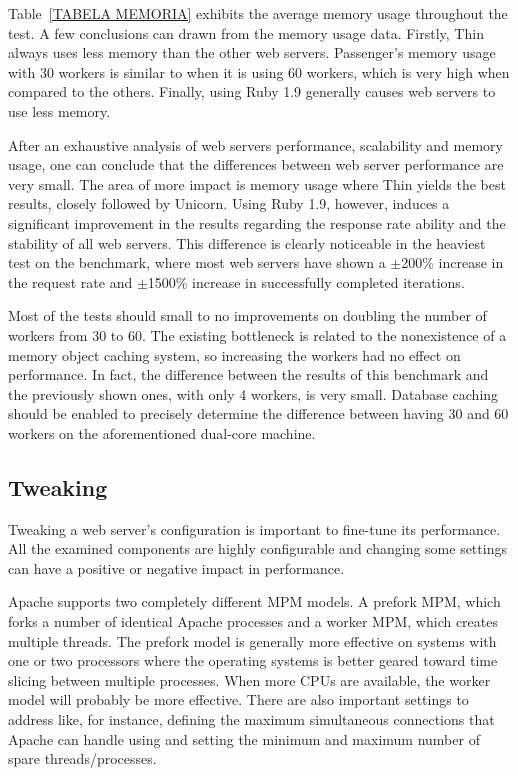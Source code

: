 Table~\ref{TABELA MEMORIA} exhibits the average memory usage throughout the test. A few conclusions can drawn from the memory usage data. Firstly, Thin always uses less memory than the other web servers. Passenger's memory usage with 30 workers is similar to when it is using 60 workers, which is very high when compared to the others. Finally, using Ruby 1.9 generally causes web servers to use less memory.

After an exhaustive analysis of web servers performance, scalability and memory usage, one can conclude that the differences between web server performance are very small. The area of more impact is memory usage where Thin yields the best results, closely followed by Unicorn. Using Ruby 1.9, however, induces a significant improvement in the results regarding the response rate ability and the stability of all web servers. This difference is clearly noticeable in the heaviest test on the benchmark, where most web servers have shown a $\pm$200\% increase in the request rate and $\pm$1500\% increase in successfully completed iterations.

Most of the tests should small to no improvements on doubling the number of workers from 30 to 60. The existing bottleneck is related to the nonexistence of a memory object caching system, so increasing the workers had no effect on performance. In fact, the difference between the results of this benchmark and the previously shown ones, with only 4 workers, is very small. Database caching should be enabled to precisely determine the difference between having 30 and 60 workers on the aforementioned dual-core machine.

\subsection{Tweaking}
Tweaking a web server's configuration is important to fine-tune its performance. All the examined components are highly configurable and changing some settings can have a positive or negative impact in performance.

Apache supports two completely different MPM models. A prefork MPM, which forks a number of identical Apache processes and a worker MPM, which creates multiple threads. The prefork model is generally more effective on systems with one or two processors where the operating systems is better geared toward time slicing between multiple processes. When more CPUs are available, the worker model will probably be more effective. There are also important settings to address like, for instance, defining the maximum simultaneous connections that Apache can handle using  and setting the minimum and maximum number of spare threads/processes.

